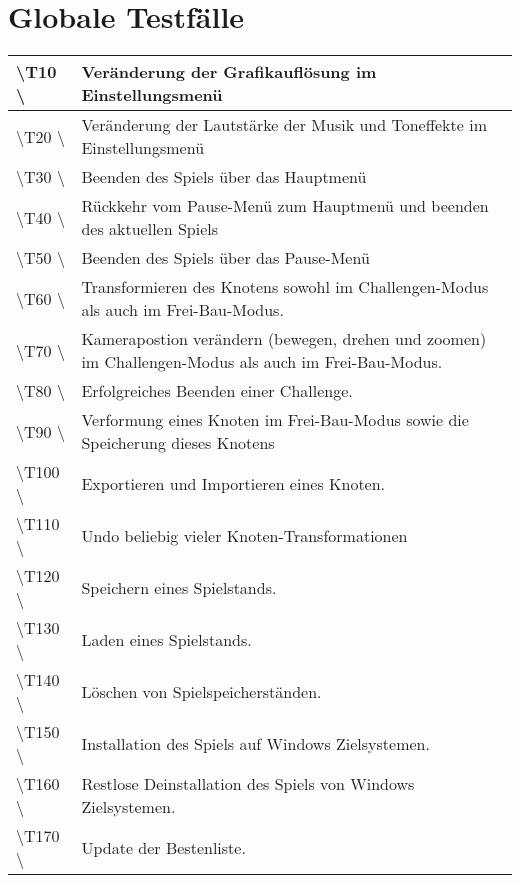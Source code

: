 \chapter{Globale Testfälle}

\begin{tabular}{|p{}|p{}|}
\hline 
\textbackslash T10  \textbackslash & Veränderung der Grafikauflösung  im Einstellungsmenü \\ 
\hline 
\textbackslash T20  \textbackslash & Veränderung der Lautstärke der Musik und Toneffekte im Einstellungsmenü  \\ 
\hline 
\textbackslash T30  \textbackslash & Beenden des Spiels über das Hauptmenü\\ 
\hline
\textbackslash T40  \textbackslash & Rückkehr vom Pause-Menü zum Hauptmenü und beenden des aktuellen Spiels \\ 
\hline
\textbackslash T50  \textbackslash & Beenden des Spiels über das Pause-Menü\\ 
\hline
\textbackslash T60  \textbackslash & Transformieren des Knotens sowohl im Challengen-Modus als auch im Frei-Bau-Modus.\\ 
\hline
\textbackslash T70  \textbackslash & Kamerapostion verändern (bewegen, drehen und zoomen) im Challengen-Modus als auch im Frei-Bau-Modus.\\ 
\hline
\textbackslash T80  \textbackslash & Erfolgreiches Beenden einer Challenge. \\ 
\hline
\textbackslash T90  \textbackslash & Verformung eines Knoten im Frei-Bau-Modus sowie die Speicherung dieses Knotens\\ 
\hline
\textbackslash T100  \textbackslash & Exportieren und Importieren eines Knoten.\\ 
\hline
\textbackslash T110  \textbackslash & Undo beliebig vieler Knoten-Transformationen\\ 
\hline
\textbackslash T120 \textbackslash & Speichern eines Spielstands. \\
\hline
\textbackslash T130 \textbackslash & Laden eines Spielstands. \\
\hline
\textbackslash T140 \textbackslash & Löschen von Spielspeicherständen. \\
\hline
\textbackslash T150 \textbackslash & Installation des Spiels auf Windows Zielsystemen. \\
\hline
\textbackslash T160 \textbackslash & Restlose Deinstallation des Spiels von Windows Zielsystemen. \\
\hline
\textbackslash T170 \textbackslash & Update der Bestenliste. \\
\hline
\end{tabular} 
